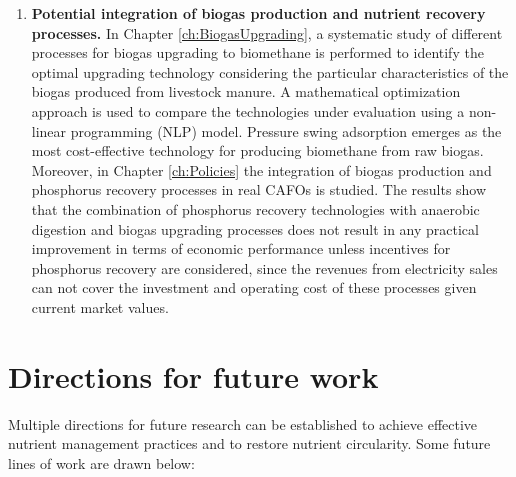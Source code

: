 \begin{enumerate}[font=\bfseries]
	\item \textbf{Potential integration of biogas production and nutrient recovery processes.} In Chapter \ref{ch:BiogasUpgrading}, a systematic study of different processes for biogas upgrading to biomethane is performed to identify the optimal upgrading technology considering the particular characteristics of the biogas produced from livestock manure. A mathematical optimization approach is used to compare the technologies under evaluation using a non-linear programming (NLP) model. Pressure swing adsorption emerges as the most cost-effective technology for producing biomethane from raw biogas. Moreover, in Chapter \ref{ch:Policies} the integration of biogas production and phosphorus recovery processes in real CAFOs is studied. The results show that the combination of phosphorus recovery technologies with anaerobic digestion and biogas upgrading processes does not result in any practical improvement in terms of economic performance unless incentives for 	phosphorus recovery are considered, since the revenues from electricity sales can not cover the investment and operating cost of these processes given current market values.
\end{enumerate}


\section{Directions for future work}
Multiple directions for future research can be established to achieve effective nutrient management practices and to restore nutrient circularity. Some future lines of work are drawn below:

